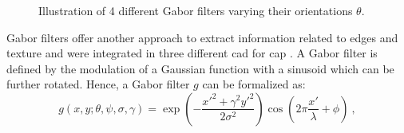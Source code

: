 \begin{figure}
	\hspace*{\fill}
		 \hfill
		 \hfill
		 \hfill
	\hspace*{\fill}
	\caption[Illustration of 4 different Gabor filters.]{Illustration of 4 different Gabor filters varying their orientations $\theta$.}
	\label{fig:gabor}
\end{figure}

Gabor filters \cite{Gabor1946,Daugman1985} offer another approach to extract information related to edges and texture and were integrated in three different \ac{cad} for \ac{cap} \cite{Viswanath2008a,Viswanath2012,Tiwari2012}.
A Gabor filter is defined by the modulation of a Gaussian function with a sinusoid which can be further rotated.
Hence, a Gabor filter $g$ can be formalized as:
\begin{equation}
	g(x,y;\theta,\psi,\sigma,\gamma) = \exp \left( - \frac{x'^{2}+ \gamma^{2}y'^{2}}{2 \sigma^{2}} \right) \cos \left( 2 \pi \frac{x'}{\lambda} + \phi \right) \ ,
\end{equation}

